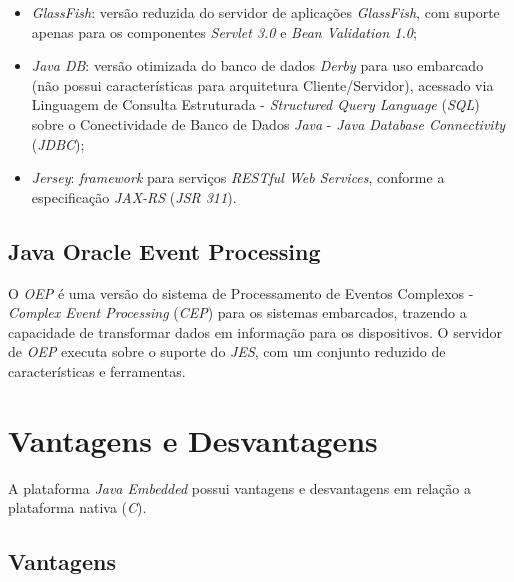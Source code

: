 \begin{itemize}

    \item \textit{GlassFish}: versão reduzida do servidor de aplicações
    \textit{GlassFish}, com suporte apenas para os componentes \textit{Servlet
    3.0} e \textit{Bean Validation 1.0};

    \item \textit{Java DB}: versão otimizada do banco de dados \textit{Derby}
    para uso embarcado (não possui características para arquitetura
    Cliente/Servidor), acessado via Linguagem de Consulta Estruturada -
    \textit{Structured Query Language} (\textit{SQL}) sobre o Conectividade de
    Banco de Dados \textit{Java} - \textit{Java Database Connectivity}
    (\textit{JDBC});

    \item \textit{Jersey}: \textit{framework} para serviços \textit{RESTful Web
    Services}, conforme a especificação \textit{JAX-RS} (\textit{JSR 311}).

\end{itemize}

\subsection{Java Oracle Event Processing}

O \textit{OEP} é uma versão do sistema de Processamento de Eventos Complexos -
\textit{Complex Event Processing} (\textit{CEP}) para os sistemas embarcados,
trazendo a capacidade de transformar dados em informação para os dispositivos.
O servidor de \textit{OEP} executa sobre o suporte do \textit{JES}, com um
conjunto reduzido de características e ferramentas.

\section{Vantagens e Desvantagens}

A plataforma \textit{Java Embedded} possui vantagens e desvantagens em relação
a plataforma nativa (\textit{C}).

\newpage
\subsection{Vantagens}

